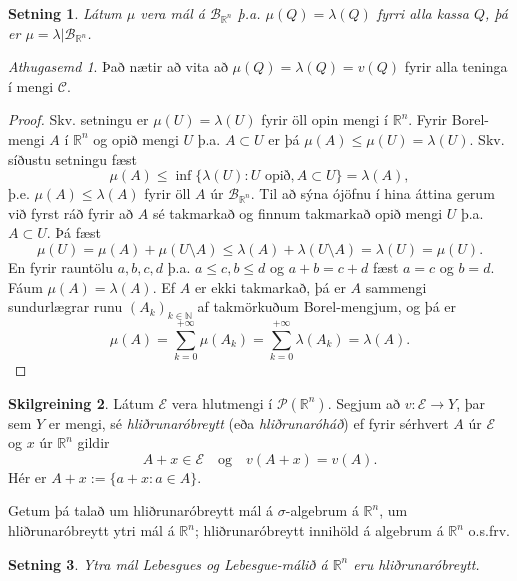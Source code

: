 \documentclass[a4paper,icelandic,11pt]{book}
\theoremstyle{plain}      \newtheorem{setn}{Setning}[chapter]
\theoremstyle{definition} \newtheorem{skilgr}[setn]{Skilgreining}
\theoremstyle{remark}     \newtheorem*{ath}{Athugasemd}
\newcommand{\R}{\mathbb R}
\newcommand{\N}{\mathbb N}
\begin{document}
\begin{setn}
  Látum $\mu$ vera mál á $\mathcal{B}_{\R^{n}}$
  þ.a. $\mu(Q)=\lambda(Q)$ fyrri alla kassa $Q$, þá er
  $\mu=\lambda|\mathcal{B}_{\R^{n}}$.
\end{setn}
\begin{ath}
  Það nætir að vita að $\mu(Q)=\lambda(Q)=v(Q)$ fyrir alla teninga í
  mengi $\mathcal{C}$.
\end{ath}
\begin{proof}
  Skv. setningu er $\mu(U)=\lambda(U)$ fyrir öll opin mengi í
  $\R^{n}$. Fyrir Borel-mengi $A$ í $\R^{n}$ og opið mengi $U$
  þ.a. $A\subset U$ er þá $\mu(A)\le\mu(U)=\lambda(U)$. Skv. síðustu
  setningu fæst
  \[
  \mu(A)
  \le\inf\{\lambda(U) : U\text{ opið}, A\subset U \}
  = \lambda(A),
  \]
  þ.e. $\mu(A)\le\lambda(A)$ fyrir öll $A$ úr
  $\mathcal{B}_{\R^{n}}$. Til að sýna ójöfnu í hina áttina gerum við
  fyrst ráð fyrir að $A$ sé takmarkað og finnum takmarkað opið mengi
  $U$ þ.a. $A\subset U$. Þá fæst
  \[
  \mu(U)
  = \mu(A) + \mu(U\setminus A)
  \le \lambda(A) + \lambda(U\setminus A)
  = \lambda(U)
  = \mu(U).
  \]
  En fyrir rauntölu $a,b,c,d$ þ.a. $a\le c,b\le d$ og $a+b=c+d$ fæst
  $a=c$ og $b=d$. Fáum $\mu(A)=\lambda(A)$. Ef $A$ er ekki takmarkað,
  þá er $A$ sammengi sundurlægrar runu $(A_{k})_{k\in\N}$ af
  takmörkuðum Borel-mengjum, og þá er
  \[
  \mu(A)
  = \sum_{k=0}^{+\infty}\mu(A_{k})
  = \sum_{k=0}^{+\infty}\lambda(A_{k})
  = \lambda(A).
  \]
\end{proof}
\begin{skilgr}
  Látum $\mathcal{E}$ vera hlutmengi í $\mathcal{P}(\R^{n})$. Segjum
  að $v:\mathcal{E}\to Y$, þar sem $Y$ er mengi, sé
  \emph{hliðrunaróbreytt}
  (eða \emph{hliðrunaróháð}) ef
  fyrir sérhvert $A$ úr $\mathcal{E}$ og $x$ úr $\R^{n}$ gildir
  \[
  A+x\in\mathcal{E}
  \quad\text{og}\quad
  v(A+x)=v(A).
  \]
  Hér er $A+x := \{a+x : a\in A\}$.
\end{skilgr}
Getum þá talað um hliðrunaróbreytt mál á $\sigma$-algebrum á $\R^{n}$,
um hliðrunaróbreytt ytri mál á $\R^{n}$; hliðrunaróbreytt innihöld á
algebrum á $\R^{n}$ o.s.frv.
\begin{setn}
  Ytra mál Lebesgues og Lebesgue-málið á $\R^{n}$ eru
  hliðrunaróbreytt.
\end{setn}
\end{document}
